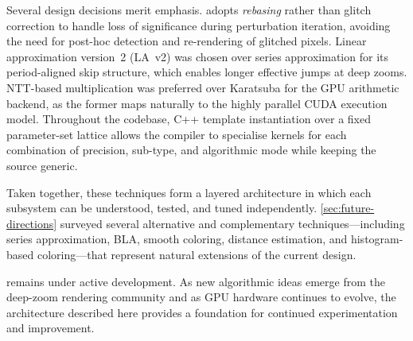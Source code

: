Several design decisions merit emphasis.  \FractalShark{} adopts
\emph{rebasing} rather than glitch correction to handle loss of
significance during perturbation iteration, avoiding the need for
post-hoc detection and re-rendering of glitched pixels.  Linear
approximation version~2 (LA~v2) was chosen over series approximation
for its period-aligned skip structure, which enables longer effective
jumps at deep zooms.  NTT-based multiplication was preferred over
Karatsuba for the GPU arithmetic backend, as the former maps naturally
to the highly parallel CUDA execution model.  Throughout the
codebase, C++ template instantiation over a fixed parameter-set
lattice allows the compiler to specialise kernels for each combination
of precision, sub-type, and algorithmic mode while keeping the source
generic.

Taken together, these techniques form a layered architecture in which
each subsystem can be understood, tested, and tuned independently.
\cref{sec:future-directions} surveyed several alternative and
complementary techniques---including series approximation, BLA,
smooth coloring, distance estimation, and histogram-based coloring---that represent
natural extensions of the current design.

\FractalShark{} remains under active development.  As new algorithmic
ideas emerge from the deep-zoom rendering community and as GPU
hardware continues to evolve, the architecture described here provides
a foundation for continued experimentation and improvement.
